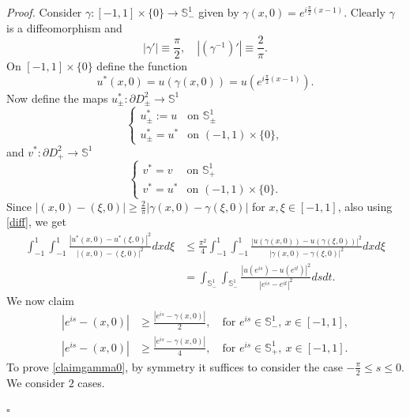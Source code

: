\documentclass[10pt,a4paper]{amsart}
\newenvironment{proof}{\noindent\emph{Proof.}}{\hfill$\square$\medskip}
\newcommand{\sph}{\mathbb{S}}
\begin{document}
\begin{proof}
Consider $\gamma:[-1,1]\times\{0\}\to\sph^1_-$ given by $\gamma(x,0)=e^{i\frac{\pi}{2}(x-1)}$. Clearly $\gamma$ is a diffeomorphism and
\begin{equation}\label{diff}
|\gamma'|\equiv\frac{\pi}{2},\quad |(\gamma^{-1})'|\equiv\frac{2}{\pi}.
\end{equation}
On $[-1,1]\times \{0\}$ define the function
$$u^*(x,0)=u(\gamma(x,0))=u(e^{i\frac{\pi}{2}(x-1)}).$$
Now define the maps $u^*_\pm :\partial D^2_\pm \to \sph^1$
\[
\begin{cases}
u^*_\pm :=u&\text{on }\sph^1_\pm\\
u^*_\pm =u^*&\text{on } (-1,1)\times \{0\},
\end{cases}
\]
and $v^*:\partial D^2_+\to \sph^1$
\[
\begin{cases}
v^*=v&\text{on }\sph^1_+\\
v^*=u^*&\text{on } (-1,1)\times \{0\}.
\end{cases}
\]
Since  $|(x,0)-(\xi,0)| \ge \frac{2}{\pi}|\gamma(x,0)-\gamma(\xi,0)|$   for $x, \xi\in [-1,1]$, also using \eqref{diff}, we get 
\begin{equation}\label{stimau*}
\begin{split}
\int_{-1}^{1}\int_{-1}^{1}\frac{|u^*(x,0)-u^*(\xi,0)|^2}{|(x,0)-(\xi,0)|^2}dxd\xi
&\le \frac{\pi^2}{4} \int_{-1}^{1}\int_{-1}^{1}\frac{|u(\gamma(x,0))-u(\gamma(\xi,0))|^2}{|\gamma(x,0)-\gamma(\xi,0)|^2}dxd\xi\\
&=  \int_{\sph^1_-}\int_{\sph^1_-}\frac{|u(e^{is})-u(e^{it})|^2}{|e^{is}-e^{it}|^2}dsdt.
\end{split}
\end{equation}
We now claim
\begin{align}\label{claimgamma0}
|e^{is}-(x,0)|&\ge \frac{|e^{is}-\gamma(x,0)|}{2},\quad \text{for }e^{is}\in \sph^1_-, \, x\in [-1,1],\\
\label{claimgamma}
|e^{is}-(x,0)|&\ge \frac{|e^{is}-\gamma(x,0)|}{4},\quad \text{for }e^{is}\in \sph^1_+,\ x\in [-1,1].
\end{align}
To prove \eqref{claimgamma0}, by symmetry it suffices to consider the case $-\frac{\pi}{2}\le s\le 0$. We consider $2$ cases.


\end{proof}
\end{document}
